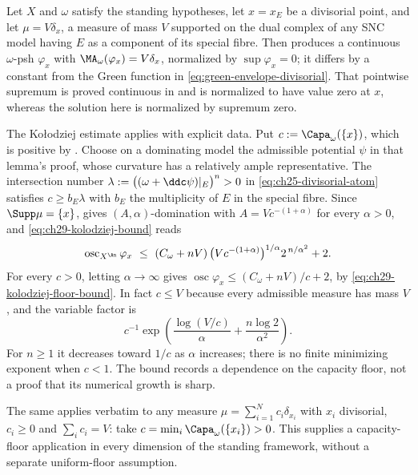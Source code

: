 \begin{example}
\label{ex:ch29-divisorial-dirac}
Let $X$ and $\omega$ satisfy the standing hypotheses, let
$x=x_E$ be a divisorial point, and let $\mu=V\delta_x$, a measure of mass
$V$ supported on the dual complex of any SNC model having $E$ as a
component of its special fibre.  Then
 produces a continuous
$\omega$-psh $\varphi_x$ with
$\MA_\omega(\varphi_x)=V\delta_x$, normalized by $\sup\varphi_x=0$; it
differs by a constant from the Green function in
\eqref{eq:green-envelope-divisorial}.  That pointwise supremum is
proved continuous in \cite[Lemma~8.5 and equation~(8.7)]{BFJ15}
and is normalized to have value zero at $x$, whereas the solution
here is normalized by supremum zero.

The Ko\l odziej estimate applies with explicit data.  Put
$c:=\Capa_\omega(\{x\})$, which is positive by
.  Choose on a dominating model the
admissible potential $\psi$ in that lemma's proof, whose curvature has a
relatively ample representative.  The intersection number
$\lambda:=\bigl((\omega+\ddc\psi)|_E\bigr)^n>0$ in
\eqref{eq:ch25-divisorial-atom} satisfies
$c\geq b_E\lambda$ with $b_E$ the multiplicity of $E$ in the special
fibre.  Since $\Supp\mu=\{x\}$,  gives
$(A,\alpha)$-domination with $A=Vc^{-(1+\alpha)}$ for every
$\alpha>0$, and \eqref{eq:ch29-kolodziej-bound} reads
\begin{equation}
\label{eq:ch29-dirac-bound}
 \operatorname{osc}_{X^{\An}}\varphi_x
 \ \leq\ (C_\omega+nV)\,
   \bigl(Vc^{-(1+\alpha)}\bigr)^{1/\alpha}2^{\,n/\alpha^2}+2 .
\end{equation}
For every $c>0$, letting $\alpha\to\infty$ gives
$\operatorname{osc}\varphi_x\leq(C_\omega+nV)/c+2$, by
\eqref{eq:ch29-kolodziej-floor-bound}.  In fact $c\leq V$ because
every admissible measure has mass $V$, and the variable factor is
\[
 c^{-1}\exp\left(\frac{\log(V/c)}{\alpha}
                 +\frac{n\log2}{\alpha^2}\right).
\]
For $n\geq1$ it decreases toward $1/c$ as $\alpha$ increases;
there is no finite minimizing exponent when $c<1$.
The bound records a dependence on the capacity floor, not a proof that
its numerical growth is sharp.

The same applies verbatim to any measure
$\mu=\sum_{i=1}^Nc_i\delta_{x_i}$ with $x_i$ divisorial,
$c_i\geq0$ and $\sum_ic_i=V$: take
$c=\min_i\Capa_\omega(\{x_i\})>0$.  This supplies a capacity-floor application in every dimension of
the standing framework, without a separate uniform-floor assumption.
\end{example}


